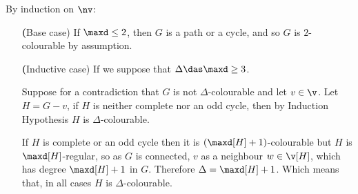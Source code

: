 \begin{prf}
    By induction on $\nv$:
    \begin{itemize}
        \item[\textbf(Base case)] If $\maxd \leq 2$, then $G$ is a path or a cycle, and so $G$ is $2$-colourable by assumption.
        \item[\textbf(Inductive case)] If we suppose that $\Delta \das \maxd \geq 3$.
        
        Suppose for a contradiction that $G$ is not $\Delta$-colourable and let $v \in \v$. Let $H = G - v$, if $H$ is neither complete nor an odd cycle, then by Induction Hypothesis $H$ is $\Delta$-colourable.

        If $H$ is complete or an odd cycle then it is $(\maxd[H] + 1)$-colourable but $H$ is $\maxd[H]$-regular, so as $G$ is connected, $v$ as a neighbour $w \in \v[H]$, which has degree $\maxd[H] + 1$ in $G$. Therefore $\Delta = \maxd[H] + 1$. Which means that, in all cases $H$ is $\Delta$-colourable.


\end{itemize}
\end{prf}
